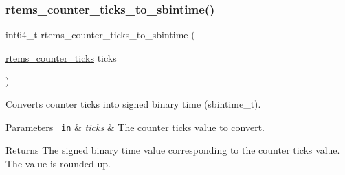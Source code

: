 \subsubsection{\texorpdfstring{rtems\_counter\_ticks\_to\_sbintime()}{rtems\_counter\_ticks\_to\_sbintime()}}
{\footnotesize\ttfamily int64\+\_\+t rtems\+\_\+counter\+\_\+ticks\+\_\+to\+\_\+sbintime (\begin{DoxyParamCaption}\item[{\mbox{\hyperlink{group__ClassicCounter_gafda796220404920ac0af841d9f555262}{rtems\+\_\+counter\+\_\+ticks}}}]{ticks }\end{DoxyParamCaption})}



Converts counter ticks into signed binary time (sbintime\+\_\+t). 


\begin{DoxyParams}[1]{Parameters}
\mbox{\texttt{ in}}  & {\em ticks} & The counter ticks value to convert.\\
\hline
\end{DoxyParams}
\begin{DoxyReturn}{Returns}
The signed binary time value corresponding to the counter ticks value. The value is rounded up. 
\end{DoxyReturn}
